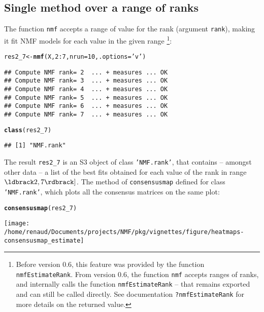 \documentclass[a4paper]{article}\usepackage[]{graphicx}\usepackage[]{color}
\makeatletter
\def\maxwidth{ %
  \ifdim\Gin@nat@width>\linewidth
    \linewidth
  \else
    \Gin@nat@width
  \fi
}
\newcommand{\hlnum}[1]{\textcolor[rgb]{0.686,0.059,0.569}{#1}}%
\newcommand{\hlstr}[1]{\textcolor[rgb]{0.192,0.494,0.8}{#1}}%
\newcommand{\hlopt}[1]{\textcolor[rgb]{0,0,0}{#1}}%
\newcommand{\hlstd}[1]{\textcolor[rgb]{0.345,0.345,0.345}{#1}}%
\newcommand{\hlkwb}[1]{\textcolor[rgb]{0.69,0.353,0.396}{#1}}%
\newcommand{\hlkwc}[1]{\textcolor[rgb]{0.333,0.667,0.333}{#1}}%
\newcommand{\hlkwd}[1]{\textcolor[rgb]{0.737,0.353,0.396}{\textbf{#1}}}%
\newenvironment{kframe}{%
 \def\at@end@of@kframe{}%
 \ifinner\ifhmode%
  \def\at@end@of@kframe{\end{minipage}}%
  \begin{minipage}{\columnwidth}%
 \fi\fi%
 \def\FrameCommand##1{\hskip\@totalleftmargin \hskip-\fboxsep
 \colorbox{shadecolor}{##1}\hskip-\fboxsep
     \hskip-\linewidth \hskip-\@totalleftmargin \hskip\columnwidth}%
 \MakeFramed {\advance\hsize-\width
   \@totalleftmargin\z@ \linewidth\hsize
   \@setminipage}}%
 {\par\unskip\endMakeFramed%
 \at@end@of@kframe}
\newenvironment{knitrout}{}{} %
\let\code=\texttt
\makeatother
\begin{document}
\subsection{Single method over a range of ranks}

The function \code{nmf} accepts a range of value for the rank (argument \code{rank}), 
making it fit NMF models for each value in the given range
\footnote{Before version 0.6, this feature was provided by the function \code{nmfEstimateRank}.
From version 0.6, the function \code{nmf} accepts ranges of ranks, and internally 
calls the function \code{nmfEstimateRank} -- that remains exported and can still 
be called directly. 
See documentation \code{?nmfEstimateRank} for more details on the returned value.}:

\begin{knitrout}
\color{fgcolor}\begin{kframe}
\begin{alltt}
\hlstd{res2_7} \hlkwb{<-} \hlkwd{nmf}\hlstd{(X,} \hlnum{2}\hlopt{:}\hlnum{7}\hlstd{,} \hlkwc{nrun}\hlstd{=}\hlnum{10}\hlstd{,} \hlkwc{.options}\hlstd{=}\hlstr{'v'}\hlstd{)}
\end{alltt}
\begin{verbatim}
## Compute NMF rank= 2  ... + measures ... OK
## Compute NMF rank= 3  ... + measures ... OK
## Compute NMF rank= 4  ... + measures ... OK
## Compute NMF rank= 5  ... + measures ... OK
## Compute NMF rank= 6  ... + measures ... OK
## Compute NMF rank= 7  ... + measures ... OK
\end{verbatim}
\begin{alltt}
\hlkwd{class}\hlstd{(res2_7)}
\end{alltt}
\begin{verbatim}
## [1] "NMF.rank"
\end{verbatim}
\end{kframe}
\end{knitrout}

The result \code{res2\_7} is an S3 object of class \code{'NMF.rank'}, 
that contains -- amongst other data -- a list of the best fits obtained for each 
value of the rank in range $\ldbrack 2, 7\rdbrack]$.
The method of \code{consensusmap} defined for class \code{'NMF.rank'}, 
which plots all the consensus matrices on the same plot: 

\begin{knitrout}
\color{fgcolor}\begin{kframe}
\begin{alltt}
\hlkwd{consensusmap}\hlstd{(res2_7)}
\end{alltt}
\end{kframe}
\texttt{[image: /home/renaud/Documents/projects/NMF/pkg/vignettes/figure/heatmaps-consensusmap\_estimate]} 

\end{knitrout}
\end{document}
